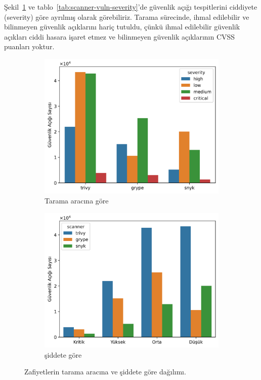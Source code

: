 Şekil~\ref{fig:vulnerabilities-by-severity} ve tablo~\ref{tab:scanner-vuln-severity}'de güvenlik açığı tespitlerini ciddiyete (severity) göre ayrılmış olarak görebiliriz. Tarama sürecinde, ihmal edilebilir ve bilinmeyen güvenlik açıklarını hariç tutuldu, çünkü ihmal edilebilir güvenlik açıkları ciddi hasara işaret etmez ve bilinmeyen güvenlik açıklarının CVSS puanları yoktur.

\begin{figure}
	\centering
	\begin{subfigure}[Figure A]{\linewidth/2}
		\includegraphics[width=1\linewidth]{images/s1/scanner-vuln-and-severity.png}
		\caption{Tarama aracına göre}\label{fig:vulnerabilities-by-severity}
	\end{subfigure}%
	\begin{subfigure}[Figure A]{\linewidth/2}
		\includegraphics[width=1\linewidth]{images/s1/severity-hue-scanner.png}
    \caption{şiddete göre}\label{fig:severity-hue-scanner}
	\end{subfigure}
 
	\caption{Zafiyetlerin tarama aracına ve şiddete göre dağılımı.}\label{fig:fig3}
\end{figure}

